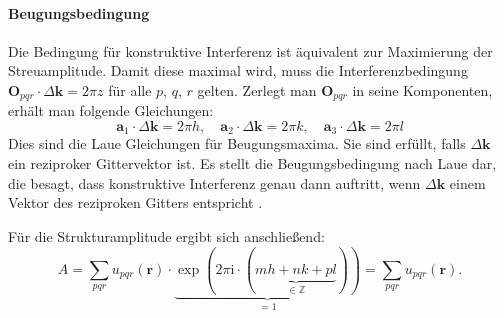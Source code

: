 \paragraph{Beugungsbedingung}
Die Bedingung für konstruktive Interferenz ist äquivalent zur Maximierung der Streuamplitude.
Damit diese maximal wird, muss die Interferenzbedingung $\mathbf{O}_{pqr}\cdot\Delta \mathbf{k} =2\pi z$
für alle $p$, $q$, $r$ gelten.
Zerlegt man $\mathbf{O}_{pqr}$ in seine Komponenten, erhält man folgende Gleichungen:
\begin{equation}
    \mathbf{a}_{1}\cdot\Delta \mathbf{k} = 2\pi h, \quad
    \mathbf{a}_{2}\cdot\Delta \mathbf{k} = 2\pi k, \quad
    \mathbf{a}_{3}\cdot\Delta \mathbf{k} = 2\pi l
    \label{eq:lauebedingung}
\end{equation}
Dies sind die Laue Gleichungen für Beugungsmaxima.
Sie sind erfüllt, falls $\Delta \mathbf{k}$ ein reziproker Gittervektor ist.
Es stellt die Beugungsbedingung nach Laue dar, die besagt, dass konstruktive Interferenz genau dann auftritt,
wenn $\Delta \mathbf{k}$ einem Vektor des reziproken Gitters entspricht \autocite{Ashcroft}.

Für die Strukturamplitude ergibt sich anschließend:
\begin{equation}
    A = \sum_{pqr} u_{pqr}(\mathbf{r}) \cdot\underbrace{ \exp(2\pi \mathrm{i}
    \cdot(\underbrace{ mh+nk+pl }_{ \in\mathbb{Z} })) }_{ =1 }
    = \sum_{pqr} u_{pqr}(\mathbf{r}).
    \label{eq:strukturamplitude}
\end{equation}

